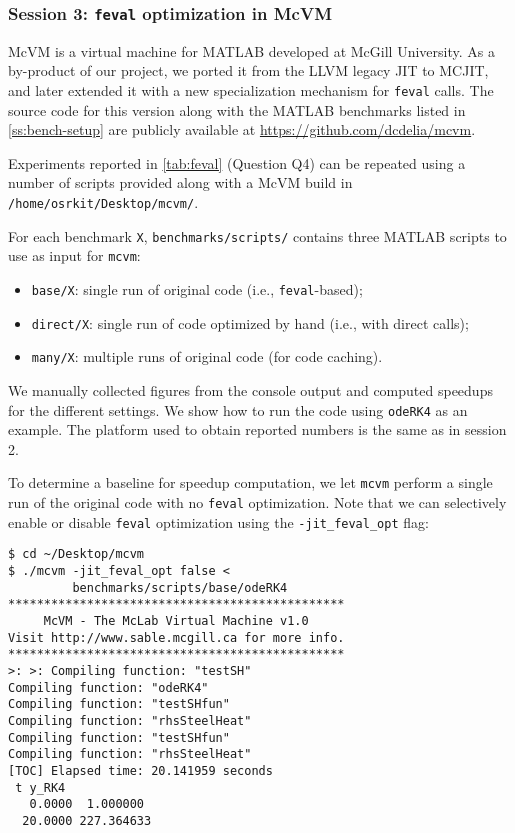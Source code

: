 
\subsubsection{Session 3: {\tt feval} optimization in McVM}

McVM is a virtual machine for MATLAB developed at McGill University. As a by-product of our project, we ported it from the LLVM legacy JIT to MCJIT, and later extended it with a new specialization mechanism for {\tt feval} calls. The source code for this version along with the MATLAB benchmarks listed in \mysection\ref{ss:bench-setup} are publicly available at \url{https://github.com/dcdelia/mcvm}.

Experiments reported in \mytable\ref{tab:feval} (Question Q4) can be repeated using a number of scripts provided along with a McVM build in {\small\tt /home/osrkit/Desktop/mcvm/}. %

For each benchmark {\tt X}, {\small\tt benchmarks/scripts/} contains three MATLAB scripts to use as input for {\tt mcvm}:

\begin{itemize}[parsep=0pt]
\item {\tt base/X}: single run of original code (i.e., {\tt feval}-based);
\item {\tt direct/X}: single run of code optimized by hand (i.e., with direct calls);
\item {\tt many/X}: multiple runs of original code (for code caching).
\end{itemize}

\noindent We manually collected figures from the console output and computed speedups for the different settings. We show how to run the code using {\tt odeRK4} as an example. The platform used to obtain reported numbers is the same as in session 2.

To determine a baseline for speedup computation, we let {\tt mcvm} perform a single run of the original code with no {\tt feval} optimization. Note that we can selectively enable or disable {\tt feval} optimization using the {\tt -jit\_feval\_opt} flag:

\begin{small}
\begin{verbatim}
$ cd ~/Desktop/mcvm
$ ./mcvm -jit_feval_opt false <
         benchmarks/scripts/base/odeRK4
***********************************************
     McVM - The McLab Virtual Machine v1.0
Visit http://www.sable.mcgill.ca for more info.
***********************************************
>: >: Compiling function: "testSH"
Compiling function: "odeRK4"
Compiling function: "testSHfun"
Compiling function: "rhsSteelHeat"
Compiling function: "testSHfun"
Compiling function: "rhsSteelHeat"
[TOC] Elapsed time: 20.141959 seconds
 t y_RK4
   0.0000  1.000000
  20.0000 227.364633
\end{verbatim}
\end{small}

